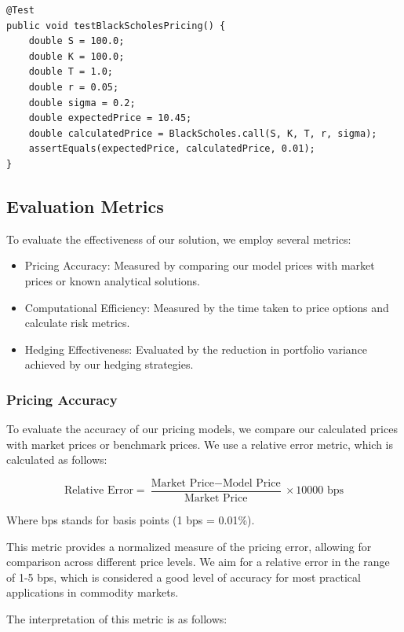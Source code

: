 \documentclass[12pt]{article}
\begin{document}
\begin{verbatim}
@Test
public void testBlackScholesPricing() {
    double S = 100.0;
    double K = 100.0;
    double T = 1.0;
    double r = 0.05;
    double sigma = 0.2;
    double expectedPrice = 10.45;
    double calculatedPrice = BlackScholes.call(S, K, T, r, sigma);
    assertEquals(expectedPrice, calculatedPrice, 0.01);
}
\end{verbatim}

\subsection{Evaluation Metrics}

To evaluate the effectiveness of our solution, we employ several metrics:

\begin{itemize}
    \item Pricing Accuracy: Measured by comparing our model prices with market prices or known analytical solutions.
    \item Computational Efficiency: Measured by the time taken to price options and calculate risk metrics.
    \item Hedging Effectiveness: Evaluated by the reduction in portfolio variance achieved by our hedging strategies.
\end{itemize}

\subsubsection{Pricing Accuracy}

To evaluate the accuracy of our pricing models, we compare our calculated prices with market prices or benchmark prices. We use a relative error metric, which is calculated as follows:

\begin{equation}
    \text{Relative Error} = \frac{\text{Market Price} - \text{Model Price}}{\text{Market Price}} \times 10000 \text{ bps}
\end{equation}

Where bps stands for basis points (1 bps = 0.01\%).

This metric provides a normalized measure of the pricing error, allowing for comparison across different price levels. We aim for a relative error in the range of 1-5 bps, which is considered a good level of accuracy for most practical applications in commodity markets.

The interpretation of this metric is as follows:
\end{document}
